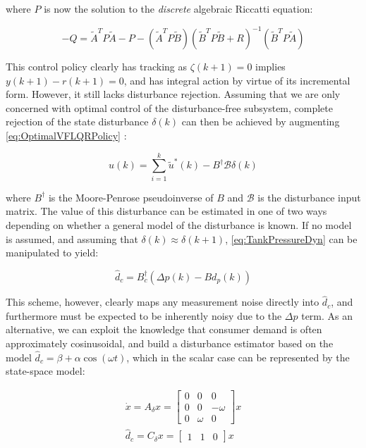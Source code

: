 where $P$ is now the solution to the \textit{discrete} algebraic Riccatti equation:

\begin{equation}\label{eq:DARE}
	-Q = \tilde{A}^TP\tilde{A} - P - (\tilde{A}^TP\tilde{B})(\tilde{B}^TP\tilde{B}+R)^{-1}(\tilde{B}^TP\tilde{A})
\end{equation}

This control policy clearly has tracking as $\zeta(k+1) = 0$ implies $y(k+1)-r(k+1) = 0$, and has integral action by virtue of its incremental form. However, it still lacks disturbance rejection. Assuming that we are only concerned with optimal control of the disturbance-free subsystem, complete rejection of the state disturbance $\delta(k)$ can then be achieved by augmenting \cref{eq:OptimalVFLQRPolicy} \cite{Singh2017}:

\begin{equation}
	u(k) = \sum_{i=1}^{k} \tilde{u}^*(k) - B^\dagger \mathcal{B}\delta(k)
\end{equation}

where $B^\dagger$ is the Moore-Penrose pseudoinverse of $B$ and $\mathcal{B}$ is the disturbance input matrix. The value of this disturbance can be estimated in one of two ways depending on whether a general model of the disturbance is known. If no model is assumed, and assuming that $\delta(k) \approx \delta(k+1)$, \cref{eq:TankPressureDyn} can be manipulated to yield:

\begin{equation}\label{eq:AgnosticDisturbanceEstimation}
	\hat{d}_c = B_c^\dagger (\Delta p(k) - Bd_p(k))
\end{equation}

This scheme, however, clearly maps any measurement noise directly into $\hat{d}_c$, and furthermore must be expected to be inherently noisy due to the $\Delta p$ term. As an alternative, we can exploit the knowledge that consumer demand is often approximately cosinusoidal, and build a disturbance estimator based on the model $\hat{d}_c = \beta + \alpha\cos(\omega t)$, which in the scalar case can be represented by the state-space model:

\begin{equation}\label{eq:TheisticDisturbanceEstimator}
	\begin{gathered}
		\dot{x} = A_\delta x =  \begin{bmatrix}0 & 0 & 0 \\ 0 & 0 & -\omega \\ 0 & \omega & 0	\end{bmatrix}x \\
		\hat{d}_c = C_\delta x = \begin{bmatrix} 1 & 1 & 0 \end{bmatrix} x
	\end{gathered}
\end{equation}

